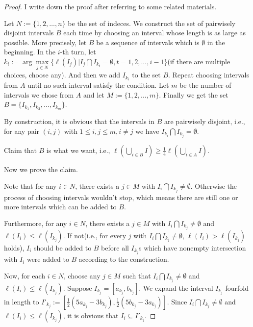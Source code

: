 \documentclass[a4paper, linespread=1.5]{article}
\begin{document}
    \begin{proof}
        I write down the proof after referring to some related materials.
        
        Let $N := \{1, 2, \ldots, n\}$ be the set of indeces. We construct the set of pairwisely disjoint intervals $B$ each time by choosing an interval whose length is as large as possible. More precisely, let $B$ be a sequence of intervals which is $\emptyset$ in the beginning. In the $i$-th turn, let $k_i := \arg\max\limits_{j \in N} \{\ell(I_j) | I_j \bigcap I_{k_t} = \emptyset, t = 1, 2, \ldots, i - 1\}$(if there are multiple choices, choose any). And then we add $I_{k_i}$ to the set $B$. Repeat choosing intervals from $A$ until no such interval satisfy the condition. Let $m$ be the number of intervals we chose from $A$ and let $M := \{1, 2, \ldots, m\}$. Finally we get the set $B = \{I_{k_1}, I_{k_2}, \ldots, I_{k_m}\}$.
        
        By construction, it is obvious that the intervals in $B$ are pairwisely disjoint, i.e., for any pair $(i, j)$ with $1 \leqslant i, j \leqslant m, i \neq j$ we have $I_{k_i} \bigcap I_{k_j} = \emptyset$.
        
        Claim that $B$ is what we want, i.e., $\ell(\bigcup_{i \in B} I) \geqslant \frac{1}{4} \ell(\bigcup_{i \in A} I)$.
        
        Now we prove the claim.
        
        Note that for any $i \in N$, there exists a $j \in M$ with $I_i \bigcap I_{k_j} \neq \emptyset$. Otherwise the process of choosing intervals wouldn't stop, which means there are still one or more intervals which can be added to $B$.
        
        Furthermore, for any $i \in N$, there exists a $j \in M$ with $I_i \bigcap I_{k_j} \neq \emptyset$ and $\ell(I_i) \leqslant \ell(I_{k_j})$. If not(i.e., for every $j$ with $I_i \bigcap I_{k_j} \neq \emptyset$, $\ell(I_i) > \ell(I_{k_j})$ holds), $I_i$ should be added to $B$ before all $I_{k_j}$s which have nonempty intersection with $I_i$ were added to $B$ according to the construction.
        
        Now, for each $i \in N$, choose any $j \in M$ such that $I_i \bigcap I_{k_j} \neq \emptyset$ and $\ell(I_i) \leqslant \ell(I_{k_j})$. Suppose $I_{k_j} = [a_{k_j}, b_{k_j}]$. We expand the interval $I_{k_j}$ fourfold in length to $I'_{k_j} := [\frac{1}{2}(5a_{k_j} - 3b_{k_j}), \frac{1}{2}(5b_{k_j} - 3a_{k_j})]$. Since $I_i \bigcap I_{k_j} \neq \emptyset$ and $\ell(I_i) \leqslant \ell(I_{k_j})$, it is obvious that $I_i \subseteq I'_{k_j}$.
        

\end{proof}
\end{document}
